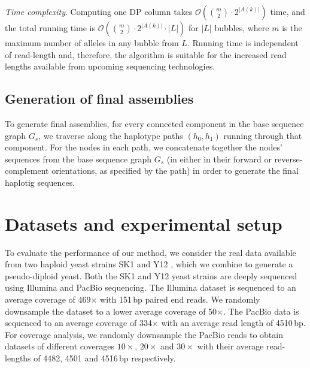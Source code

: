 \textit{Time complexity}. 
Computing one DP column takes $\mathcal{O}( {m \choose 2} \cdot 2^{|A(k)|})$ time, and the total running time is $\mathcal{O}( {m \choose 2} \cdot 2^{|A(k)|} \cdot |L|)$ for $|L|$ bubbles, where $m$ is the maximum number of alleles in any bubble from $L$. 
Running time is independent of read-length and, therefore, the algorithm is suitable for the increased read lengths available from upcoming sequencing technologies.

\subsection{Generation of final assemblies}
To generate final assemblies, for every connected component in the base sequence graph $G_s$, we traverse along the haplotype paths $(h_0,h_1)$ running through that component. For the nodes in each path, we concatenate together the nodes' sequences from the base sequence graph $G_s$ (in either in their forward or reverse-complement orientations, as specified by the path) in order to generate the final haplotig sequences.

\section{Datasets and experimental setup}
To evaluate the performance of our method, we consider the real data available from two haploid yeast strains SK1 and Y12 \citep{yue2017contrasting}, which we combine to generate a pseudo-diploid yeast.
Both the SK1 and Y12 yeast strains are deeply sequenced using Illumina and PacBio sequencing.
The Illumina dataset is sequenced to an average coverage of 469$\times$ with 151\,bp paired end reads. We randomly downsample the dataset to a lower average coverage of 50$\times$.
The PacBio data is sequenced to an average coverage of 334$\times$ with an average read length of 4510\,bp. 
For coverage analysis, we randomly downsample the PacBio reads to obtain datasets of different coverages $10\times$, $20\times$ and $30\times$ with their average read-lengths of 4482, 4501 and 4516\,bp respectively.


